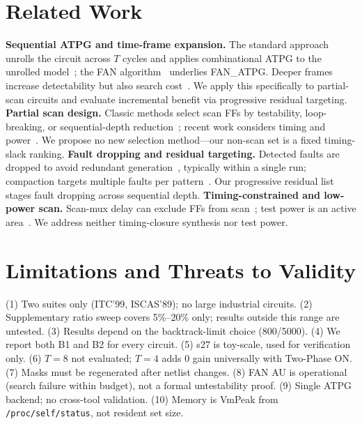 \documentclass[conference]{IEEEtran}
\begin{document}
\section{Related Work}
\label{sec:related}
\textbf{Sequential ATPG and time-frame expansion.} The standard approach unrolls
the circuit across $T$ cycles and applies combinational ATPG to the unrolled
model~\cite{ref1,ref2}; the FAN algorithm~\cite{ref1} underlies FAN\_ATPG.
Deeper frames increase detectability but also search cost~\cite{ref3}. We apply
this specifically to partial-scan circuits and evaluate incremental benefit via
progressive residual targeting.
\textbf{Partial scan design.} Classic methods select scan FFs by testability,
loop-breaking, or sequential-depth reduction~\cite{ref4,ref5,ref6}; recent work
considers timing and power~\cite{ref7,ref8,ref9}. We propose no new selection
method---our non-scan set is a fixed timing-slack ranking.
\textbf{Fault dropping and residual targeting.} Detected faults are dropped to
avoid redundant generation~\cite{ref10}, typically within a single run;
compaction targets multiple faults per pattern~\cite{ref11}. Our progressive
residual list stages fault dropping across sequential depth.
\textbf{Timing-constrained and low-power scan.} Scan-mux delay can exclude FFs
from scan~\cite{ref12,ref13}; test power is an active area~\cite{ref7,ref14,ref15}.
We address neither timing-closure synthesis nor test power.

\section{Limitations and Threats to Validity}
\label{sec:limitations}
(1) Two suites only (ITC'99, ISCAS'89); no large industrial circuits. (2)
Supplementary ratio sweep covers 5\%--20\% only; results outside this range are
untested. (3) Results depend on the backtrack-limit choice (800/5000). (4) We report both
B1 and B2 for every circuit. (5) s27 is toy-scale, used for verification only.
(6) $T{=}8$ not evaluated; $T{=}4$ adds 0 gain universally with Two-Phase ON.
(7) Masks must be regenerated after netlist changes. (8) FAN AU is operational
(search failure within budget), not a formal untestability proof. (9) Single ATPG
backend; no cross-tool validation. (10) Memory is VmPeak from
\texttt{/proc/self/status}, not resident set size.
\end{document}
